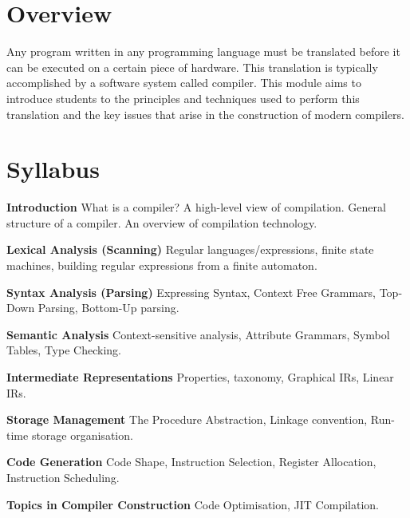 \section*{Overview}

Any program written in any programming language must be translated before it can be executed on a certain piece of hardware. This translation is typically accomplished by a software system called compiler. This module aims to introduce students to the principles and techniques used to perform this translation and the key issues that arise in the construction of modern compilers.

\section*{Syllabus}
\begin{mymulticols}
\begin{description}
\item{\textbf{Introduction}}
What is a compiler? A high-level view of compilation. General structure of a 
compiler. An overview of compilation technology.

\item{\textbf{Lexical Analysis (Scanning)}}
Regular languages/expressions, finite state machines, building regular
expressions from a finite automaton.

\item{\textbf{Syntax Analysis (Parsing)}}
Expressing Syntax, Context Free Grammars, Top-Down Parsing, Bottom-Up parsing.

\item{\textbf{Semantic Analysis}}
Context-sensitive analysis, Attribute Grammars, Symbol Tables, Type Checking.

\item{\textbf{Intermediate Representations}}
Properties, taxonomy, Graphical IRs, Linear IRs.

\item{\textbf{Storage Management}}
The Procedure Abstraction, Linkage convention, Run-time storage organisation.

\item{\textbf{Code Generation}}
Code Shape, Instruction Selection, Register Allocation, Instruction Scheduling.

\item{\textbf{Topics in Compiler Construction}}
Code Optimisation, JIT Compilation.
\end{description}
\end{mymulticols}

